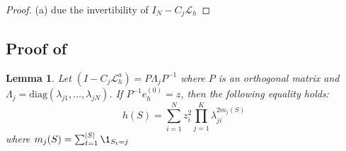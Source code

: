 \documentclass{article}
\newtheorem{lemma}[theorem]{Lemma}
\begin{document}
\begin{proof}

(a) due the invertibility of $I_N - C_j\mathcal{L}_h$

\end{proof}

\subsection{Proof of } \label{sec:proofsimultaneousallocation}

\begin{lemma} \label{th:simultaneousallocation}
     Let $\left(I - C_j \mathcal{L}_{h}^a\right) = P\Lambda_jP^{-1}$ where $P$ is an orthogonal matrix and $\Lambda_j = \mathrm{diag}(\lambda_{j1}, \dots, \lambda_{jN})$. If $P^{-1}e^{(0)}_h = z$, then the following equality holds:
     \begin{equation} \label{eq:simultaneous}
          h(S) = \sum_{i = 1}^N z_i^2 \prod_{j = 1}^K \lambda_{ji}^{2m_j(S)}
     \end{equation}
     where $m_j(S) = \sum_{t= 1}^{|S|}\1_{S_t = j}$
\end{lemma}
\end{document}
